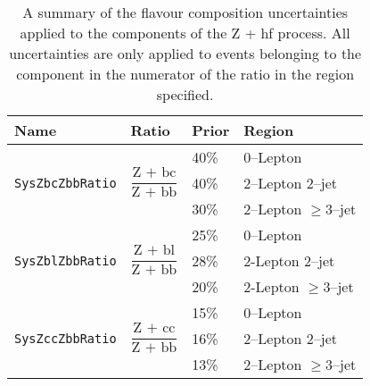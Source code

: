 \begin{table}[!htbp]
  \begin{tabular}{llll}
    \toprule
    {\bfseries Name} & {\bfseries Ratio} & {\bfseries Prior} & {\bfseries Region}\\ 
    \midrule
    \multirow{ 3}{*}{\texttt{SysZbcZbbRatio}} & \multirow{ 3}{*}{$\dfrac{\text{Z + bc}}{\text{Z + bb}}$} & 40\% & 0--Lepton \\
                     &								    & 40\% & 2--Lepton 2--jet \\
                     &								    & 30\% & 2--Lepton $\geq$3--jet \\
    \multirow{ 3}{*}{\texttt{SysZblZbbRatio}} & \multirow{ 3}{*}{$\dfrac{\text{Z + bl}}{\text{Z + bb}}$} & 25\% & 0--Lepton \\
                     &								    & 28\% & 2-Lepton 2--jet \\
                     &								    & 20\% & 2-Lepton $\geq$3--jet \\
    \multirow{ 3}{*}{\texttt{SysZccZbbRatio}}    & \multirow{ 3}{*}{$\dfrac{\text{Z + cc}}{\text{Z + bb}}$} & 15\% & 0--Lepton \\
                     &								    &  16\% & 2--Lepton 2--jet \\
                     &								    &   13\% & 2--Lepton $\geq$3--jet \\
    \bottomrule
  \end{tabular}
  \caption{A summary of the flavour composition uncertainties applied to the
    components of the Z + hf process. All uncertainties are only applied to
    events belonging to the component in the numerator of the ratio in the
    region specified.}
  \label{tab:zjets-flavour-comp}
\end{table}